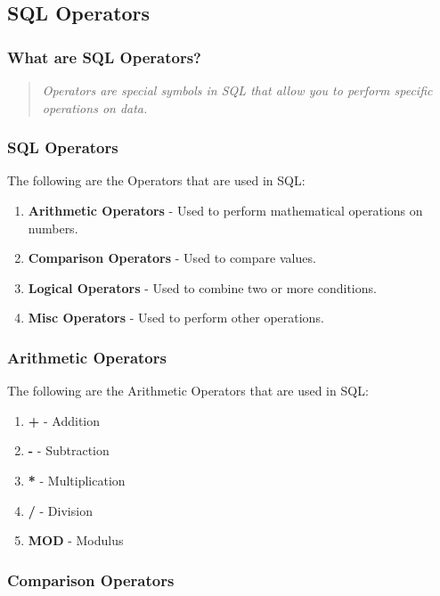 \documentclass[11pt]{article}
\begin{document}
\subsection{SQL Operators}

\subsubsection{What are SQL Operators?}
\begin{quote}
	\textit{Operators are special symbols in SQL that allow you to perform specific operations on data.}
\end{quote}

\subsubsection{SQL Operators}

The following are the Operators that are used in SQL:

\begin{enumerate}
	\item \textbf{Arithmetic Operators} - Used to perform mathematical operations on numbers.
	\item \textbf{Comparison Operators} - Used to compare values.
	\item \textbf{Logical Operators} - Used to combine two or more conditions.
	\item \textbf{Misc Operators} - Used to perform other operations.
\end{enumerate}

\subsubsection{Arithmetic Operators}

The following are the Arithmetic Operators that are used in SQL:

\begin{enumerate}
	\item \textbf{+} - Addition
	\item \textbf{-} - Subtraction
	\item \textbf{*} - Multiplication
	\item \textbf{/} - Division
	\item \textbf{MOD} - Modulus
\end{enumerate}

\subsubsection{Comparison Operators}
\end{document}
